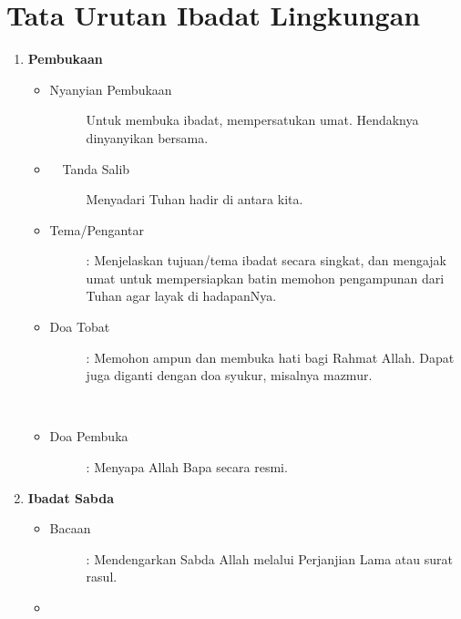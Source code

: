\section{Tata Urutan Ibadat Lingkungan} 

\begin{enumerate}
\item {\large \textbf{Pembukaan}}
\begin{itemize}
\item \begin{description}
\item[Nyanyian Pembukaan]
Untuk membuka ibadat, mempersatukan umat. Hendaknya dinyanyikan bersama.
\end{description}

\item \begin{description}
\item[\Cross ~~Tanda Salib]
Menyadari Tuhan hadir di antara kita.
\end{description}

\item \begin{description}
\item[Tema/Pengantar]: Menjelaskan tujuan/tema ibadat secara singkat, dan
mengajak umat untuk mempersiapkan batin memohon pengampunan dari Tuhan
agar layak di hadapanNya.
\end{description}
\item \begin{description}
\item [Doa Tobat]: Memohon ampun dan membuka hati bagi Rahmat Allah. Dapat
juga diganti dengan doa syukur, misalnya mazmur.
\end{description}

\newpage
{~}
\newpage
{~}
\newpage
{~}
\item \begin{description}
\item [Doa Pembuka]: Menyapa Allah Bapa secara resmi.
\end{description}
\end{itemize}

\item {\large \textbf{Ibadat Sabda}}
\begin{itemize}

\item \begin{description}
\item[Bacaan] : Mendengarkan Sabda Allah melalui Perjanjian Lama atau
surat rasul.
\end{description}
\item \begin{description}


\end{description}
\end{itemize}
\end{enumerate}
